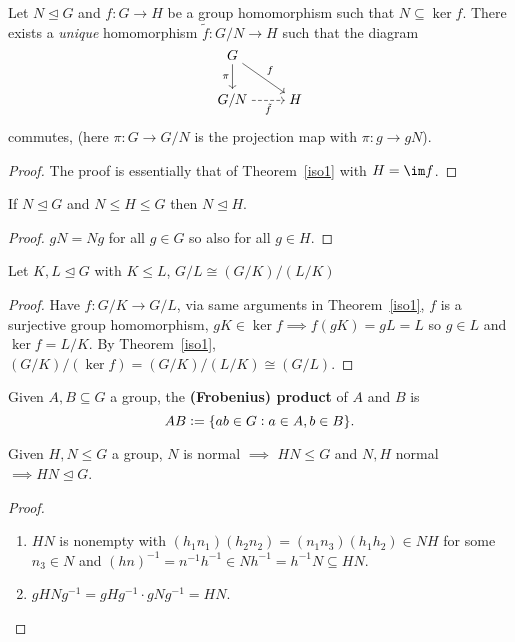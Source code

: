 \documentclass[../Year2.tex]{subfiles}
\begin{document}
\begin{theorem}
    Let $N\unlhd G$ and $f:G\rightarrow H$ be a group homomorphism such that $N\subseteq \ker f$. There exists a \textit{unique} homomorphism $\tilde{f}:G/N\rightarrow H$ such that the diagram \[
        \begin{tikzcd}[cramped]
            G \arrow[d, swap, "\pi"] \arrow[rd, "f"]\\
            G/N \arrow[r, dashed, swap, "\tilde{f}"] & H
        \end{tikzcd}
    \] commutes, (here $\pi:G\rightarrow G/N$ is the projection map with $\pi:g\rightarrow gN$).

    \begin{proof}
        The proof is essentially that of Theorem~\ref{iso1} with $H=\im f$.
    \end{proof}
\end{theorem}

\begin{lemma}
    If $N\unlhd G$ and $N\leq H\leq G$ then $N\unlhd H$.
    \begin{proof}
        $gN=Ng$ for all $g\in G$ so also for all $g\in H$.
    \end{proof}
\end{lemma}

\begin{theorem}
    Let $K,L\unlhd G$ with $K\leq L$, $G/L\cong (G/K)/(L/K)$

    \begin{proof}
        Have $f:G/K\rightarrow G/L$, via same arguments  in Theorem~\ref{iso1}, $f$ is a surjective group homomorphism, $gK\in \ker f\implies f(gK)=gL=L$ so $g\in L$ and $\ker f = L/K$. By Theorem~\ref{iso1}, $(G/K)/(\ker  f) = (G/K)/(L/K)\cong (G/L)$. 
    \end{proof}
\end{theorem}

\begin{definition}
    Given $A,B\subseteq G$ a group, the \textbf{(Frobenius) product} of $A$ and $B$ is \[
        AB := \{ab\in G: a\in A, b\in B\}
    \text{\textcolor{black}{.}}
    \]
    \vspace{-20pt}
\end{definition}

\begin{lemma}
    Given $H,N\leq G$ a group, $N$ is normal $\implies$ $HN\leq G$ and $N,H$ normal $\implies HN\unlhd G$.
    \begin{proof}
        \begin{enumerate}
            \item $HN$ is nonempty with $(h_1n_1)(h_2n_2)=(n_1n_3)(h_1h_2)\in NH$ for some $n_3\in N$ and $(hn)^{-1}=n^{-1}h^{-1}\in Nh^{-1} = h^{-1}N\subseteq HN$.
            \item $gHNg^{-1} = gHg^{-1} \cdot gNg^{-1} = HN$.
        \end{enumerate}
    \vspace{-15pt}
    \end{proof}
\end{lemma}
\end{document}
